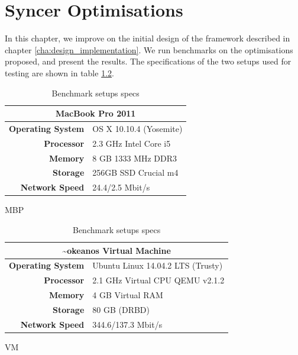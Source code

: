
\chapter{Syncer Optimisations}
\label{cha:optimisations}
In this chapter, we improve on the initial design of the framework described in chapter \ref{cha:design_implementation}. We run benchmarks on the optimisations proposed, and present the results. The specifications of the two setups used for testing are shown in table \ref{table:benchmark-specs}.

\begin{table}[H]
  \centering
  \begin{adjustbox}{max width=1.2\textwidth, center}
    \begin{subtable}{0.5\textwidth}
      \begin{tabular}{|r|l|} \hline
        \multicolumn{2}{|c|}{\textbf{MacBook Pro 2011}} \\ \hline
        \textbf{Operating System} & OS X 10.10.4 (Yosemite)\\ \hline
        \textbf{Processor} & 2.3 GHz Intel Core i5\\ \hline
        \textbf{Memory} & 8 GB 1333 MHz DDR3 \\ \hline
        \textbf{Storage} & 256GB SSD Crucial m4\\ \hline
        \textbf{Network Speed} & 24.4/2.5 Mbit/s\\ \hline
      \end{tabular}
      \caption{MBP}
    \end{subtable}

    \begin{subtable}{0.5\textwidth}
      \begin{tabular}{|r|l|} \hline
        \multicolumn{2}{|c|}{\textbf{\textasciitilde okeanos Virtual Machine}}
        \\ \hline
        \textbf{Operating System} & Ubuntu Linux 14.04.2 LTS (Trusty)\\ \hline
        \textbf{Processor} & 2.1 GHz Virtual CPU QEMU v2.1.2 \\ \hline
        \textbf{Memory} & 4 GB Virtual RAM \\ \hline
        \textbf{Storage} & 80 GB (DRBD) \\ \hline
        \textbf{Network Speed} & 344.6/137.3 Mbit/s\\ \hline
      \end{tabular}
      \caption{VM}
    \end{subtable}
  \end{adjustbox}
  \caption{Benchmark setups specs}
  \label{table:benchmark-specs}
\end{table}

